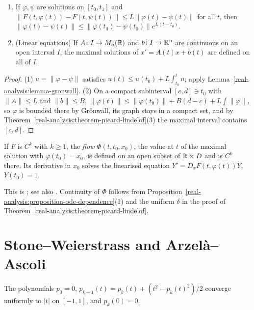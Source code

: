 \begin{proposition}\label{real-analysis:proposition-ode-dependence}
\begin{enumerate}
\item If $\varphi, \psi$ are solutions on $[t_0, t_1]$ and $\|F(t, \varphi(t)) - F(t, \psi(t))\| \leq L\|\varphi(t) - \psi(t)\|$ for all $t$, then
$\|\varphi(t) - \psi(t)\| \leq \|\varphi(t_0) - \psi(t_0)\|e^{L(t - t_0)}$.
\item (Linear equations) If $A \colon I \to M_n(\mathbb{R})$ and $b \colon I \to \mathbb{R}^n$ are continuous on an open interval $I$, the maximal solutions of $x' = A(t)x + b(t)$ are defined on all of $I$.
\end{enumerate}
\end{proposition}

\begin{proof}
(1) $u = \|\varphi - \psi\|$ satisfies $u(t) \leq u(t_0) + L\int_{t_0}^tu$; apply Lemma~\ref{real-analysis:lemma-gronwall}. (2) On a compact subinterval $[c, d] \ni t_0$ with $\|A\| \leq L$ and $\|b\| \leq B$,
$\|\varphi(t)\| \leq \|\varphi(t_0)\| + B(d - c) + L\int\|\varphi\|$, so $\varphi$ is bounded there by Gr\"onwall, its graph stays in a compact set, and by Theorem~\ref{real-analysis:theorem-picard-lindelof}(3)
the maximal interval contains $[c, d]$.
\end{proof}

\begin{theorem}\label{real-analysis:theorem-smooth-dependence}
If $F$ is $C^k$ with $k \geq 1$, the \emph{flow} $\Phi(t, t_0, x_0)$, the value at $t$ of the maximal solution with $\varphi(t_0) = x_0$, is defined on an open subset of $\mathbb{R} \times D$ and is $C^k$
there. Its derivative in $x_0$ solves the linearised equation $Y' = D_xF(t, \varphi(t))Y$, $Y(t_0) = 1$.
\end{theorem}

This is \cite[Chapter V]{hartman-ode}; see also \cite{lang-real-functional}. Continuity of $\Phi$ follows from Proposition~\ref{real-analysis:proposition-ode-dependence}(1) and the uniform $\delta$ in
the proof of Theorem~\ref{real-analysis:theorem-picard-lindelof}.

\section{Stone--Weierstrass and Arzel\`a--Ascoli}\label{real-analysis:section-approximation}

\begin{lemma}\label{real-analysis:lemma-absolute-value-polynomials}
The polynomials $p_0 = 0$, $p_{k+1}(t) = p_k(t) + (t^2 - p_k(t)^2)/2$ converge uniformly to $|t|$ on $[-1, 1]$, and $p_k(0) = 0$.
\end{lemma}

